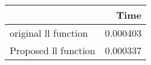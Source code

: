 \begin{tabular}{lr}
\toprule
{} &      Time \\
\midrule
original ll function &  0.000403 \\
Proposed ll function &  0.000337 \\
\bottomrule
\end{tabular}

